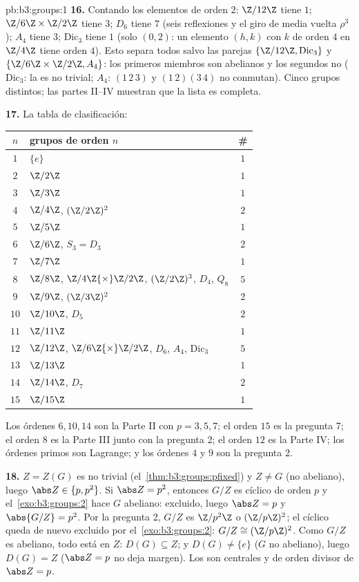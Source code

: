 \begin{solution}{pb:b3:groups:1}
\textbf{16.} Contando los elementos de orden $2$: $\Z/12\Z$ tiene $1$;
$\Z/6\Z\times\Z/2\Z$ tiene $3$; $D_6$ tiene $7$ (seis reflexiones y el
giro de media vuelta $\rho^3$); $A_4$ tiene $3$; $\mathrm{Dic}_3$ tiene
$1$ (solo $(0, 2)$: un elemento $(h, k)$ con $k$ de orden $4$ en
$\Z/4\Z$ tiene orden $4$). Esto separa todos salvo las parejas
$\{\Z/12\Z, \mathrm{Dic}_3\}$ y $\{\Z/6\Z\times\Z/2\Z, A_4\}$: los
primeros miembros son abelianos y los segundos no ($\mathrm{Dic}_3$: la
 es no trivial; $A_4$: $(1\,2\,3)$
y $(1\,2)(3\,4)$ no conmutan). Cinco grupos distintos; las partes II--IV
muestran que la lista es completa.

\textbf{17.} La tabla de clasificación:
\begin{center}
\begin{tabular}{c l c}
$n$ & grupos de orden $n$ & \#\\
\hline
$1$ & $\{e\}$ & $1$\\
$2$ & $\Z/2\Z$ & $1$\\
$3$ & $\Z/3\Z$ & $1$\\
$4$ & $\Z/4\Z$, $(\Z/2\Z)^2$ & $2$\\
$5$ & $\Z/5\Z$ & $1$\\
$6$ & $\Z/6\Z$, $S_3 = D_3$ & $2$\\
$7$ & $\Z/7\Z$ & $1$\\
$8$ & $\Z/8\Z$, $\Z/4\Z{\times}\Z/2\Z$, $(\Z/2\Z)^3$, $D_4$,
      $Q_8$ & $5$\\
$9$ & $\Z/9\Z$, $(\Z/3\Z)^2$ & $2$\\
$10$ & $\Z/10\Z$, $D_5$ & $2$\\
$11$ & $\Z/11\Z$ & $1$\\
$12$ & $\Z/12\Z$, $\Z/6\Z{\times}\Z/2\Z$, $D_6$, $A_4$,
       $\mathrm{Dic}_3$ & $5$\\
$13$ & $\Z/13\Z$ & $1$\\
$14$ & $\Z/14\Z$, $D_7$ & $2$\\
$15$ & $\Z/15\Z$ & $1$\\
\end{tabular}
\end{center}
Los órdenes $6, 10, 14$ son la Parte II con $p = 3, 5, 7$; el orden $15$
es la pregunta 7; el orden $8$ es la Parte III junto con la pregunta 2;
el orden $12$ es la Parte IV; los órdenes primos son Lagrange; y los
órdenes $4$ y $9$ son la pregunta 2.

\textbf{18.} $Z = Z(G)$ es no trivial (el~\cref{thm:b3:groups:pfixed}) y
$Z \neq G$ (no abeliano), luego $\abs Z \in \{p, p^2\}$. Si
$\abs Z = p^2$, entonces $G/Z$ es cíclico de orden $p$ y
el~\cref{exo:b3:groups:2} hace $G$ abeliano: excluido, luego
$\abs Z = p$ y $\abs{G/Z} = p^2$. Por la pregunta 2, $G/Z$ es $\Z/p^2\Z$
o $(\Z/p\Z)^2$; el cíclico queda de nuevo excluido por
el~\cref{exo:b3:groups:2}: $G/Z \cong (\Z/p\Z)^2$. Como $G/Z$ es
abeliano, todo  está en $Z$:
$D(G) \subseteq Z$; y $D(G) \neq \{e\}$ ($G$ no abeliano), luego
$D(G) = Z$ ($\abs Z = p$ no deja margen). Los
 son centrales y de orden
divisor de
$\abs Z = p$.


\end{solution}
